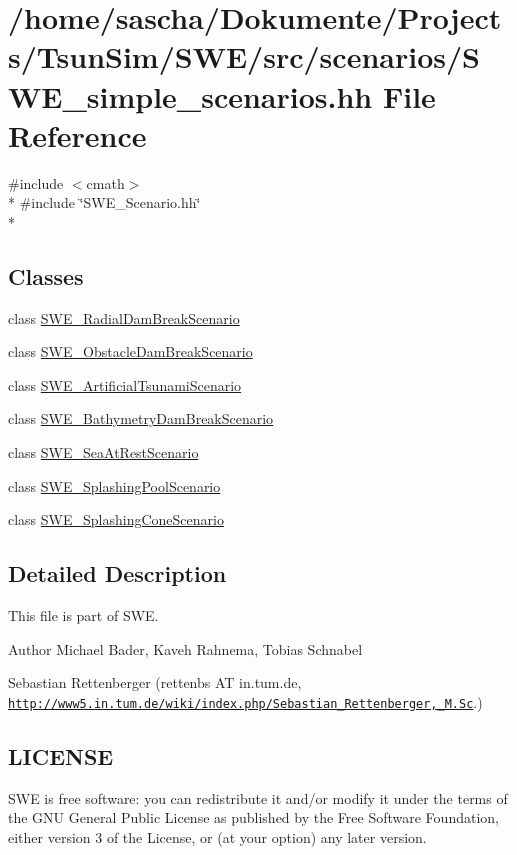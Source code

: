 \hypertarget{SWE__simple__scenarios_8hh}{\section{/home/sascha/\-Dokumente/\-Projects/\-Tsun\-Sim/\-S\-W\-E/src/scenarios/\-S\-W\-E\-\_\-simple\-\_\-scenarios.hh File Reference}
\label{SWE__simple__scenarios_8hh}
}
{\ttfamily \#include $<$cmath$>$}\\*
{\ttfamily \#include \char`\"{}S\-W\-E\-\_\-\-Scenario.\-hh\char`\"{}}\\*
\subsection*{Classes}
\begin{DoxyCompactItemize}
\item 
class \hyperlink{classSWE__RadialDamBreakScenario}{S\-W\-E\-\_\-\-Radial\-Dam\-Break\-Scenario}
\item 
class \hyperlink{classSWE__ObstacleDamBreakScenario}{S\-W\-E\-\_\-\-Obstacle\-Dam\-Break\-Scenario}
\item 
class \hyperlink{classSWE__ArtificialTsunamiScenario}{S\-W\-E\-\_\-\-Artificial\-Tsunami\-Scenario}
\item 
class \hyperlink{classSWE__BathymetryDamBreakScenario}{S\-W\-E\-\_\-\-Bathymetry\-Dam\-Break\-Scenario}
\item 
class \hyperlink{classSWE__SeaAtRestScenario}{S\-W\-E\-\_\-\-Sea\-At\-Rest\-Scenario}
\item 
class \hyperlink{classSWE__SplashingPoolScenario}{S\-W\-E\-\_\-\-Splashing\-Pool\-Scenario}
\item 
class \hyperlink{classSWE__SplashingConeScenario}{S\-W\-E\-\_\-\-Splashing\-Cone\-Scenario}
\end{DoxyCompactItemize}


\subsection{Detailed Description}
This file is part of S\-W\-E.

\begin{DoxyAuthor}{Author}
Michael Bader, Kaveh Rahnema, Tobias Schnabel 

Sebastian Rettenberger (rettenbs A\-T in.\-tum.\-de, \href{http://www5.in.tum.de/wiki/index.php/Sebastian_Rettenberger,_M.Sc}{\tt http\-://www5.\-in.\-tum.\-de/wiki/index.\-php/\-Sebastian\-\_\-\-Rettenberger,\-\_\-\-M.\-Sc}.)
\end{DoxyAuthor}
\hypertarget{Writer_8hh_LICENSE}{}\subsection{L\-I\-C\-E\-N\-S\-E}\label{Writer_8hh_LICENSE}
S\-W\-E is free software\-: you can redistribute it and/or modify it under the terms of the G\-N\-U General Public License as published by the Free Software Foundation, either version 3 of the License, or (at your option) any later version.

